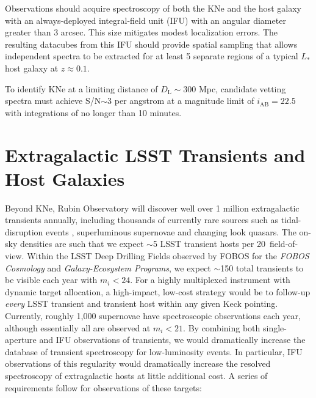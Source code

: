 \documentclass[11pt,a4paper,twoside,onecolumn,openany,final,oldfontcommands]{memoir}
\begin{document}
\medskip
\begin{sciencerequirement}

\reqitem Observations should acquire spectroscopy of both the KNe and the host galaxy with an always-deployed integral-field unit (IFU) with an angular diameter greater than 3 arcsec.  This size mitigates modest localization errors.  The resulting datacubes from this IFU should provide spatial sampling that allows independent spectra to be extracted for at least 5 separate regions of a typical $L_*$ host galaxy at $z \approx 0.1$.

\reqitem  To identify KNe at a limiting distance of $D_\mathrm{L}\sim300$ Mpc,
candidate vetting spectra must achieve S/N$\sim$3 per angstrom at a magnitude limit of $i_\mathrm{AB}=22.5$ with integrations of no longer than 10 minutes.

\end{sciencerequirement}

\section{Extragalactic LSST Transients and Host Galaxies}
\label{sec:lssttransients}


Beyond KNe, Rubin Observatory will discover well over 1 million extragalactic transients annually, including thousands of currently rare sources such as tidal-disruption events \citep{bricman2020}, superluminous supernovae \citep{villar2018} and changing look quasars.  The on-sky densities are such that we expect $\sim$5 LSST transient hosts per 20\arcmin\ field-of-view.  Within the LSST Deep Drilling Fields observed by FOBOS for the {\it FOBOS Cosmology} and {\it Galaxy-Ecosystem Programs}, we expect $\sim$150 total transients to be visible each year with $m_i<24$. For a highly multiplexed instrument with dynamic target allocation, a high-impact, low-cost strategy would be to follow-up \textit{every} LSST transient and transient host within any given Keck pointing. Currently, roughly 1,000 supernovae have spectroscopic observations each year, although essentially all are observed at $m_i<21$. By combining both single-aperture and IFU observations of transients, we would dramatically increase the database of transient spectroscopy for low-luminosity events.  In particular, IFU observations of this regularity would dramatically increase the resolved spectroscopy of extragalactic hosts \citep[see a recent review by][]{anderson2015} at little additional cost. A series of requirements follow for observations of these targets:
\end{document}
